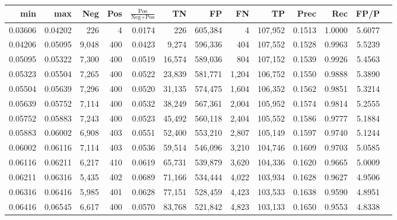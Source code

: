 \begin{tabular}{rrrrrrrrrrrrr}
\toprule
    min &     max &   Neg & Pos & $\frac{\text{Pos}}{\text{Neg}+\text{Pos}}$ &      TN &      FP &      FN &      TP &   Prec &    Rec &   FP/P \\
\midrule
0.03606 & 0.04202 &   226 &   4 &                                     0.0174 &     226 & 605,384 &       4 & 107,952 & 0.1513 & 1.0000 & 5.6077 \\
0.04206 & 0.05095 & 9,048 & 400 &                                     0.0423 &   9,274 & 596,336 &     404 & 107,552 & 0.1528 & 0.9963 & 5.5239 \\
0.05095 & 0.05322 & 7,300 & 400 &                                     0.0519 &  16,574 & 589,036 &     804 & 107,152 & 0.1539 & 0.9926 & 5.4563 \\
0.05323 & 0.05504 & 7,265 & 400 &                                     0.0522 &  23,839 & 581,771 &   1,204 & 106,752 & 0.1550 & 0.9888 & 5.3890 \\
0.05504 & 0.05639 & 7,296 & 400 &                                     0.0520 &  31,135 & 574,475 &   1,604 & 106,352 & 0.1562 & 0.9851 & 5.3214 \\
0.05639 & 0.05752 & 7,114 & 400 &                                     0.0532 &  38,249 & 567,361 &   2,004 & 105,952 & 0.1574 & 0.9814 & 5.2555 \\
0.05752 & 0.05883 & 7,243 & 400 &                                     0.0523 &  45,492 & 560,118 &   2,404 & 105,552 & 0.1586 & 0.9777 & 5.1884 \\
0.05883 & 0.06002 & 6,908 & 403 &                                     0.0551 &  52,400 & 553,210 &   2,807 & 105,149 & 0.1597 & 0.9740 & 5.1244 \\
0.06002 & 0.06116 & 7,114 & 403 &                                     0.0536 &  59,514 & 546,096 &   3,210 & 104,746 & 0.1609 & 0.9703 & 5.0585 \\
0.06116 & 0.06211 & 6,217 & 410 &                                     0.0619 &  65,731 & 539,879 &   3,620 & 104,336 & 0.1620 & 0.9665 & 5.0009 \\
0.06211 & 0.06316 & 5,435 & 402 &                                     0.0689 &  71,166 & 534,444 &   4,022 & 103,934 & 0.1628 & 0.9627 & 4.9506 \\
0.06316 & 0.06416 & 5,985 & 401 &                                     0.0628 &  77,151 & 528,459 &   4,423 & 103,533 & 0.1638 & 0.9590 & 4.8951 \\
0.06416 & 0.06545 & 6,617 & 400 &                                     0.0570 &  83,768 & 521,842 &   4,823 & 103,133 & 0.1650 & 0.9553 & 4.8338 \\

\end{tabular}
